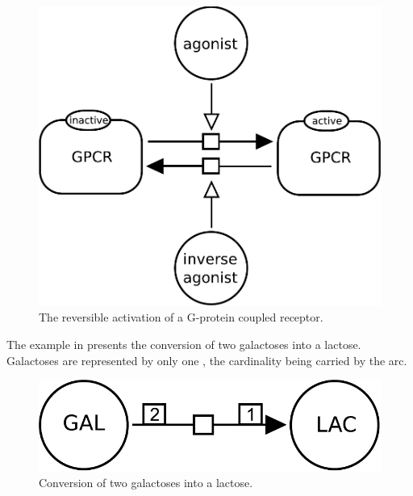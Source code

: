 \begin{figure}[H]
  \centering
  \includegraphics[scale = 0.3]{examples/process-modulated}
  \caption{The reversible activation of a G-protein coupled receptor.}
  \label{fig:trans-mod}
\end{figure}

The example in  presents the conversion of two galactoses into a lactose.  Galactoses are represented by only one , the cardinality being carried by the  arc.

\begin{figure}[H]
  \centering
  \includegraphics[scale = 0.3]{examples/process-dimerisation}
  \caption{Conversion of two galactoses into a lactose.}
  \label{fig:trans-dim}
\end{figure}




